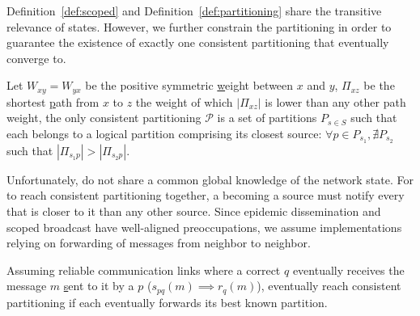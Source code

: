 Definition~\ref{def:scoped} and Definition~\ref{def:partitioning}
share the transitive relevance of \process states. However, we further
constrain the partitioning in order to guarantee the existence of
exactly one consistent partitioning that \processes eventually converge
to.

\begin{definition}
  Let $W_{xy} = W_{yx}$ be the positive symmetric \underline{w}eight
  between $x$ and $y$, $\Pi_{xz}$ be the shortest \underline{p}ath
  from $x$ to $z$ the weight of which $|\Pi_{xz}|$ is lower than any
  other path weight, the only consistent partitioning $\mathcal{P}$ is
  a set of partitions $P_{s\in S}$ such that each \process belongs to
  a logical partition comprising its closest source: $\forall p \in
  P_{s_1}, \nexists P_{s_2}$ such that $|\Pi_{s_1p}| > |\Pi_{s_2p}|$.
\end{definition}

Unfortunately, \processes do not share a common global knowledge of
the network state. For \processes to reach consistent partitioning
together, a \process becoming a source must notify every \process that
is closer to it than any other source. Since epidemic dissemination
and scoped broadcast have well-aligned preoccupations, we assume
implementations relying on forwarding of messages from neighbor to
neighbor.

\begin{theorem}
%
Assuming reliable communication links where a correct \process $q$
eventually receives the message $m$ \underline{s}ent to it by a
\process $p$ ($s_{pq}(m) \implies r_{q}(m)$), \processes eventually
reach consistent partitioning if each \process eventually forwards its
best known partition.
\end{theorem}

 

